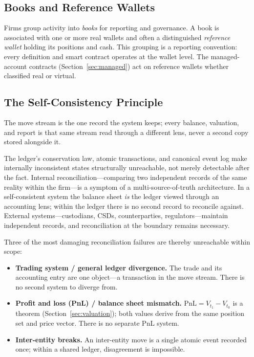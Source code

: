 \subsection{Books and Reference Wallets}

Firms group activity into \emph{books} for reporting and governance. A book is associated with one or more real wallets and often a distinguished \emph{reference wallet} holding its positions and cash. This grouping is a reporting convention: every definition and smart contract operates at the wallet level. The managed-account contracts (Section~\ref{sec:managed}) act on reference wallets whether classified real or virtual.

\subsection{The Self-Consistency Principle}

The move stream is the one record the system keeps; every balance, valuation, and report is that same stream read through a different lens, never a second copy stored alongside it.

\begin{principle}
The ledger's conservation law, atomic transactions, and canonical event log make internally inconsistent states structurally unreachable, not merely detectable after the fact. Internal reconciliation---comparing two independent records of the same reality within the firm---is a symptom of a multi-source-of-truth architecture. In a self-consistent system the balance sheet \emph{is} the ledger viewed through an accounting lens; within the ledger there is no second record to reconcile against. External systems---custodians, CSDs, counterparties, regulators---maintain independent records, and reconciliation at the boundary remains necessary.
\end{principle}

Three of the most damaging reconciliation failures are thereby unreachable within scope:

\begin{itemize}[nosep]
\item \textbf{Trading system / general ledger divergence.} The trade and its accounting entry are one object---a transaction in the move stream. There is no second system to diverge from.
\item \textbf{Profit and loss (PnL) / balance sheet mismatch.} $\mathrm{PnL} = V_{t_1} - V_{t_0}$ is a theorem (Section~\ref{sec:valuation}); both values derive from the same position set and price vector. There is no separate PnL system.
\item \textbf{Inter-entity breaks.} An inter-entity move is a single atomic event recorded once; within a shared ledger, disagreement is impossible.
\end{itemize}

